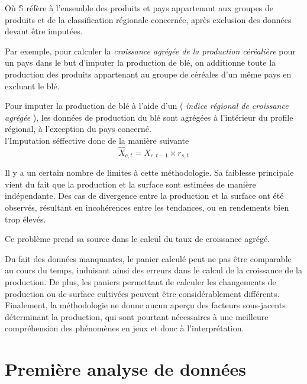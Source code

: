 \documentclass[nojss]{jss}\usepackage{graphicx, color}
\begin{document}
O\`{u} $\mathbb{S}$ r\'{e}f\`{e}re \`{a} l'ensemble des produits et
pays appartenant aux groupes de produits et de la classification
r\'{e}gionale concern\'{e}e, apr\`{e}s exclusion des donn\'{e}es
devant \^{e}tre imput\'{e}es.


Par exemple, pour calculer la \textit{croissance agr\'{e}g\'{e}e de la
  production c\'{e}r\'{e}ali\`{e}re} pour un pays dans le but
d'imputer la production de bl\'{e}, on additionne toute la production
des produits appartenant au groupe de c\'{e}r\'{e}ales d'un m\^{e}me pays
en excluant le bl\'{e}.

Pour imputer la production de bl\'{e} \`{a} l'aide d'un (\textit{
  indice r\'{e}gional de croissance agr\'{e}g\'{e}e }), les
donn\'{e}es de production du bl\'{e} sont agr\'{e}g\'{e}es \`{a}
l'int\'{e}rieur du profile r\'{e}gional, \`{a} l'exception du pays
concern\'{e}. \\


l'Imputation s\'{e}ffective donc de la mani\`{e}re suivante
\begin{equation}
  \hat{X}_{c, t} = X_{c, t-1} \times r_{s, t}
\end{equation}
  
Il y a un certain nombre de limites \`{a} cette m\'{e}thodologie. Sa
faiblesse principale vient du fait que la production et la surface
sont estim\'{e}es de mani\`{e}re ind\'{e}pendante. Des cas de
divergence entre la production et la surface ont \'{e}t\'{e}
observ\'{e}s, r\'{e}sultant en incoh\'{e}rences entre les tendances,
ou en rendements bien trop \'{e}lev\'{e}s.


Ce probl\`{e}me prend sa source dans le calcul du taux de croissance
agr\'{e}g\'{e}.

Du fait des donn\'{e}es manquantes, le panier calcul\'{e} peut ne pas
\^{e}tre comparable au cours du temps, induisant ainsi des erreurs
dans le calcul de la croissance de la production. De plus, les paniers
permettant de calculer les changements de production ou de surface
cultiv\'{e}es peuvent \^{e}tre consid\'{e}rablement
diff\'{e}rents. Finalement, la m\'{e}thodologie ne donne aucun
aper\c{c}u des facteurs sous-jacents d\'{e}terminant la production,
qui sont pourtant n\'{e}cessaires \`{a} une meilleure
compr\'{e}hension des ph\'{e}nom\`{e}nes en jeux et donc \`{a}
l'interpr\'{e}tation.


\section{Premi\`{e}re analyse de donn\'{e}es}
\end{document}
